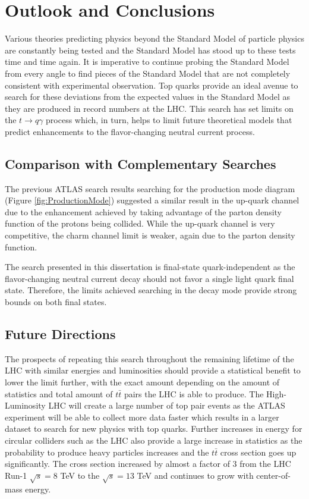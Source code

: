 
\chapter{Outlook and Conclusions}
\label{ch:Conclusion}
Various theories predicting physics beyond the Standard Model of particle physics are constantly being tested and the Standard Model has stood up to these tests time and time again.  It is imperative to continue probing the Standard Model from every angle to find pieces of the Standard Model that are not completely consistent with experimental observation.  Top quarks provide an ideal avenue to search for these deviations from the expected values in the Standard Model as they are produced in record numbers at the LHC.  This search has set limits on the $t\rightarrow q \gamma$ process which, in turn, helps to limit future theoretical models that predict enhancements to the flavor-changing neutral current process.

\section{Comparison with Complementary Searches}

The previous ATLAS search results searching for the production mode diagram (Figure \ref{fig:ProductionMode})\cite{GregorFCNC} suggested a similar result in the up-quark channel due to the enhancement achieved by taking advantage of the parton density function of the protons being collided.  While the up-quark channel is very competitive, the charm channel limit is weaker, again due to the parton density function.  

The search presented in this dissertation is final-state quark-independent as the flavor-changing neutral current decay should not favor a single light quark final state.  Therefore, the limits achieved searching in the decay mode provide strong bounds on both final states. 

\section{Future Directions}
The prospects of repeating this search throughout the remaining lifetime of the LHC with similar energies and luminosities should provide a statistical benefit to lower the limit further, with the exact amount depending on the amount of statistics and total amount of $t\bar{t}$ pairs the LHC is able to produce.  The High-Luminosity LHC will create a large number of top pair events as the ATLAS experiment will be able to collect more data faster which results in a larger dataset to search for new physics with top quarks.  Further increases in energy for circular colliders such as the LHC also provide a large increase in statistics as the probability to produce heavy particles increases and the $t\bar{t}$ cross section goes up significantly.  The cross section increased by almost a factor of 3 from the LHC Run-1 $\sqrt{s}=8$ TeV to the $\sqrt{s}=13$ TeV and continues to grow with center-of-mass energy.

